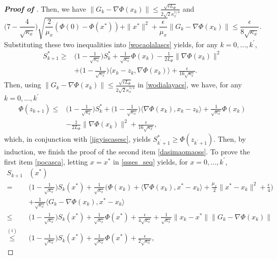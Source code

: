 \documentclass{osudissert96}
\begin{document}
\begin{proof}[{\bf Proof of }]
 Then, we have $\|G_k-\nabla \Phi( x_k)\| \leq \frac{\sqrt{\epsilon L_\Phi}}{2\sqrt{2}\kappa_x^{1/4}}$ and $$\big(7-\frac{4}{\sqrt{\kappa_x}} \big)\sqrt{\frac{2}{\mu_x}(\Phi(0) -\Phi(x^*))+ \|x^*\|^2+\frac{\epsilon}{\mu_x}}\|G_k-\nabla \Phi( x_k)\| \leq \frac{\epsilon}{8\sqrt{\kappa_x}}.$$   Substituting these two inequalities into \cref{wocaolalascs} yields, for any $k=0,...,k^\prime$,
\begin{align}\label{jigyiscasesc}
 S_{k+1}^* \geq & \Big(1-\frac{1}{\sqrt{\kappa_x}} \Big) S_{k}^* +\frac{1}{\sqrt{\kappa_x}}\Phi(x_k) - \frac{1}{2L_\Phi}\|\nabla\Phi(x_k)\|^2 \nonumber
 \\&+\Big(1-\frac{1}{\sqrt{\kappa_x}} \Big)\langle x_k-z_k,\nabla \Phi(x_k) \rangle  + \frac{\epsilon}{16\sqrt{\kappa_x}}.
\end{align}
Then, using $\|G_k-\nabla \Phi( x_k)\| \leq \frac{\sqrt{\epsilon L_\Phi}}{2\sqrt{2}\kappa_x^{1/4}}$ in \cref{wodialayacs}, we have, for any $k=0,...,k^\prime$
\begin{align*}
\Phi(z_{k+1})\leq &\Big( 1- \frac{1}{\sqrt{\kappa_x}}\Big) S_k^* +\Big( 1- \frac{1}{\sqrt{\kappa_x}}\Big) \langle \nabla\Phi(x_k),x_k-z_k\rangle + \frac{1}{\sqrt{\kappa_x}}\Phi(x_k) \nonumber
 \\&-\frac{1}{2L_\Phi}\| \nabla \Phi(x_k)\|^2 + \frac{\epsilon}{16\sqrt{\kappa_x}},
\end{align*}
which, in conjunction with \cref{jigyiscasesc}, yields $S_{k^\prime+1}^*\geq \Phi(z_{k^\prime+1})$.  Then, by induction, we finish the proof of the second item \cref{dasimaomaoss}. To prove the first item \cref{pocasca}, letting $x=x^*$ in \cref{ssses_seq} yields, for $x=0,...,k^\prime$, 
\begin{align}\label{dalaoqiuings}
S_{k+1}&(x^*) \nonumber
\\= & \Big(1 -\frac{1}{\sqrt{\kappa_x}} \Big)S_{k}(x^*)  +\frac{1}{\sqrt{\kappa_x}} \big( \Phi(x_k) +\langle \nabla\Phi(x_k),x^*-x_k\rangle + \frac{\mu_x}{2}\|x^* - x_k\|^2 + \frac{ \epsilon}{4}\big) \nonumber
\\&+\frac{1}{\sqrt{\kappa_x}}\langle G_k-\nabla\Phi(x_k),x^*-x_k\rangle \nonumber
\\\leq&  \Big(1 -\frac{1}{\sqrt{\kappa_x}} \Big)S_{k}(x^*) +\frac{1}{\sqrt{\kappa_x}} \Phi(x^*) +\frac{\epsilon}{4\sqrt{\kappa_x}}  + \frac{1}{\sqrt{\kappa_x}} \|x_k-x^*\|\|G_k-\nabla\Phi(x_k)\|\nonumber
\\\overset{(i)}\leq & \Big(1 -\frac{1}{\sqrt{\kappa_x}} \Big)S_{k}(x^*) +\frac{1}{\sqrt{\kappa_x}} \Phi(x^*) +\frac{\epsilon}{2\sqrt{\kappa_x}},  

\end{align}
\end{proof}
\end{document}

